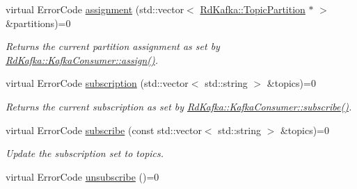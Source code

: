 \begin{DoxyCompactItemize}
\item 
\hypertarget{classRdKafka_1_1KafkaConsumer_afd22626a2b370f378272e30411df6f78}{
virtual ErrorCode \hyperlink{classRdKafka_1_1KafkaConsumer_afd22626a2b370f378272e30411df6f78}{assignment} (std::vector$<$ \hyperlink{classRdKafka_1_1TopicPartition}{RdKafka::TopicPartition} $\ast$ $>$ \&partitions)=0}
\label{classRdKafka_1_1KafkaConsumer_afd22626a2b370f378272e30411df6f78}

\begin{DoxyCompactList}\small\item\em Returns the current partition assignment as set by \hyperlink{classRdKafka_1_1KafkaConsumer_af3f872bcb7d46febbaea63518f854b46}{RdKafka::KafkaConsumer::assign()}. \item\end{DoxyCompactList}\item 
\hypertarget{classRdKafka_1_1KafkaConsumer_a470f95d195c1c0dc9466040cdf1ec12d}{
virtual ErrorCode \hyperlink{classRdKafka_1_1KafkaConsumer_a470f95d195c1c0dc9466040cdf1ec12d}{subscription} (std::vector$<$ std::string $>$ \&topics)=0}
\label{classRdKafka_1_1KafkaConsumer_a470f95d195c1c0dc9466040cdf1ec12d}

\begin{DoxyCompactList}\small\item\em Returns the current subscription as set by \hyperlink{classRdKafka_1_1KafkaConsumer_a7404297cecc9be656026c6c6154ce2bd}{RdKafka::KafkaConsumer::subscribe()}. \item\end{DoxyCompactList}\item 
virtual ErrorCode \hyperlink{classRdKafka_1_1KafkaConsumer_a7404297cecc9be656026c6c6154ce2bd}{subscribe} (const std::vector$<$ std::string $>$ \&topics)=0
\begin{DoxyCompactList}\small\item\em Update the subscription set to {\ttfamily topics}. \item\end{DoxyCompactList}\item 
\hypertarget{classRdKafka_1_1KafkaConsumer_a933d7e1d8bceab2422463ee8b335f15b}{
virtual ErrorCode \hyperlink{classRdKafka_1_1KafkaConsumer_a933d7e1d8bceab2422463ee8b335f15b}{unsubscribe} ()=0}
\label{classRdKafka_1_1KafkaConsumer_a933d7e1d8bceab2422463ee8b335f15b}


\end{DoxyCompactItemize}
